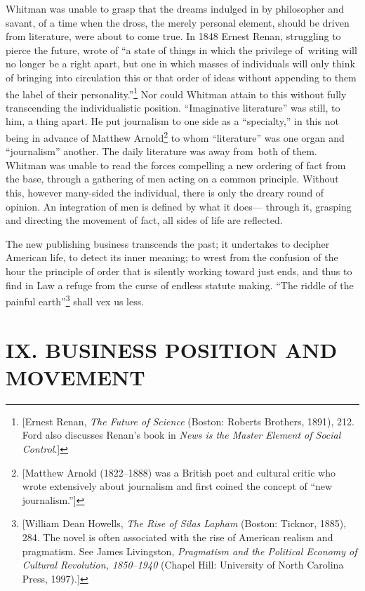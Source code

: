 \documentclass[twoside,symmetric,nobib,justified]{tufte-book}
\begin{document}
Whitman was unable to grasp that the dreams indulged in by philosopher
and savant, of a time when the dross, the merely personal element,
should be driven from literature, were about to come true. In 1848
Ernest Renan, struggling to pierce the future, wrote of ``a state of
things in which the privilege of~writing will no longer be a right
apart, but one in which masses of individuals will only think of
bringing into circulation this or that order of ideas without appending
to them the label of their personality.''\footnote{{[}Ernest Renan,
  \emph{The Future of Science} (Boston: Roberts Brothers, 1891), 212.
  Ford also discusses Renan's book in \emph{News is the Master Element
  of Social Control}.{]}} Nor could Whitman attain to this without fully
transcending the individualistic position. ``Imaginative literature''
was still, to him, a thing apart. He put journalism to one side as a
``specialty,'' in this not being in advance of Matthew Arnold\footnote{{[}Matthew
  Arnold (1822--1888) was a British poet and cultural critic who wrote
  extensively about journalism and first coined the concept of ``new
  journalism.''{]}} to whom ``literature'' was one organ and
``journalism'' another. The daily literature was away from~both of them.
Whitman was unable to read the forces compelling a new ordering of fact
from the base, through a gathering of men acting on a common principle.
Without this, however many-sided the individual, there is only the
dreary round of opinion. An integration of men is defined by what it
does--- through it, grasping and directing the movement of fact, all
sides of life are reflected.~

The new publishing business transcends the past; it undertakes to
decipher American life, to detect its inner meaning; to wrest from the
confusion of the hour the principle of order that is silently working
toward just ends, and thus to find in Law a refuge from the curse of
endless statute making. ``The riddle of the painful earth''\footnote{{[}William
  Dean Howells, \emph{The Rise of Silas Lapham} (Boston: Ticknor, 1885),
  284. The novel is often associated with the rise of American realism
  and pragmatism. See James Livingston, \emph{Pragmatism and the
  Political Economy of Cultural Revolution, 1850--1940} (Chapel Hill:
  University of North Carolina Press, 1997).{]}} shall vex us less.~

\hypertarget{ix-business-position-and-movement}{%
\section{IX. BUSINESS POSITION AND
MOVEMENT}\label{ix-business-position-and-movement}}
\end{document}

